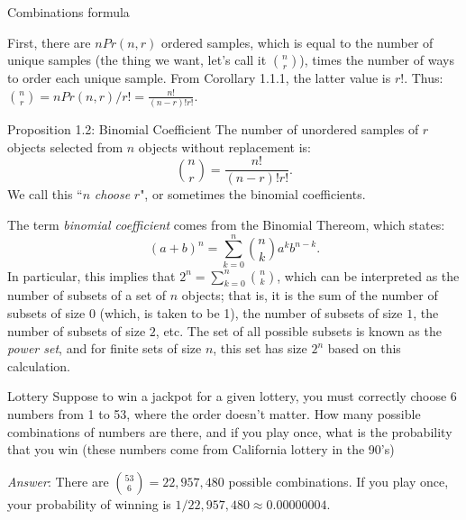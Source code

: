 \begin{frame}[allowframebreaks]{Combinations formula}

First, there are $nPr(n, r)$ ordered samples, which is equal to the number of unique samples (the thing we want, let's call it $\binom{n}{r}$), times the number of ways to order each unique sample. From Corollary 1.1.1, the latter value is $r!$. Thus: $\binom{n}{r} = nPr(n, r) / r! = \frac{n!}{(n-r)!r!}$.

\begin{block}{Proposition 1.2: Binomial Coefficient}
  The number of unordered samples of $r$ objects selected from $n$ objects without replacement is:
  $$
  \binom{n}{r} = \frac{n!}{(n-r)!r!}.
  $$
  We call this ``$n$ \emph{choose} $r$", or sometimes the binomial coefficients.
\end{block}

The term \emph{binomial coefficient} comes from the Binomial Thereom, which states: 
$$
(a + b)^n = \sum_{k = 0}^n \binom{n}{k}a^kb^{n-k}.
$$
In particular, this implies that $2^n = \sum_{k = 0}^n \binom{n}{k}$, which can be interpreted as the number of subsets of a set of $n$ objects; that is, it is the sum of the number of subsets of size $0$ (which, is taken to be 1), the number of subsets of size $1$, the number of subsets of size $2$, etc. The set of all possible subsets is known as the \emph{power set}, and for finite sets of size $n$, this set has size $2^n$ based on this calculation.
  
\end{frame}

\begin{frame}{Lottery}
  Suppose to win a jackpot for a given lottery, you must correctly choose 6 numbers from 1 to 53, where the order doesn't matter. How many possible combinations of numbers are there, and if you play once, what is the probability that you win (these numbers come from California lottery in the 90's)
  
  \emph{Answer}: There are $\binom{53}{6} = 22,957,480$ possible combinations. If you play once, your probability of winning is $1/22,957,480 \approx 0.00000004$.
\end{frame}

